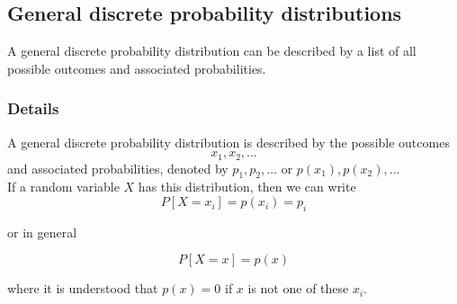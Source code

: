 \documentclass[12pt,a4paper]{article}
\theoremstyle{regla}
\theoremstyle{remark}
\theoremstyle{definition}
\theoremstyle{nonumberbreak}
\begin{document}
\subsection{General discrete probability distributions}
\begin{fbox}
\begin{minipage}{0.97\textwidth}
A general discrete probability distribution can be described by a list of all possible outcomes and associated probabilities.

\end{minipage}
\end{fbox}
\subsubsection{Details}
A general discrete probability distribution is described by the possible outcomes 
$$
x_1, x_2, \ldots
$$ 
and associated probabilities, denoted by 
$
p_1, p_2, \ldots$ or $p(x_1), p(x_2),\ldots$\\

If a random variable $X$ has this distribution, then we can write
$$
P[X=x_i] = p(x_i)= p_i
$$

or in general

$$
P[X=x] = p(x)
$$

where it is understood that $p(x) = 0$ if $x$ is not one of these $x_i$.
\end{document}
